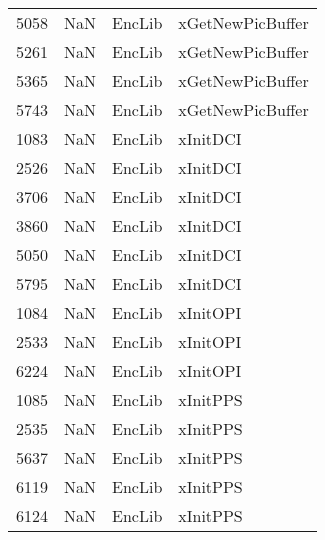 \begin{tabular}{llll}
5058 &                   NaN &                     EncLib &                          xGetNewPicBuffer \\
5261 &                   NaN &                     EncLib &                          xGetNewPicBuffer \\
5365 &                   NaN &                     EncLib &                          xGetNewPicBuffer \\
5743 &                   NaN &                     EncLib &                          xGetNewPicBuffer \\
1083 &                   NaN &                     EncLib &                                  xInitDCI \\
2526 &                   NaN &                     EncLib &                                  xInitDCI \\
3706 &                   NaN &                     EncLib &                                  xInitDCI \\
3860 &                   NaN &                     EncLib &                                  xInitDCI \\
5050 &                   NaN &                     EncLib &                                  xInitDCI \\
5795 &                   NaN &                     EncLib &                                  xInitDCI \\
1084 &                   NaN &                     EncLib &                                  xInitOPI \\
2533 &                   NaN &                     EncLib &                                  xInitOPI \\
6224 &                   NaN &                     EncLib &                                  xInitOPI \\
1085 &                   NaN &                     EncLib &                                  xInitPPS \\
2535 &                   NaN &                     EncLib &                                  xInitPPS \\
5637 &                   NaN &                     EncLib &                                  xInitPPS \\
6119 &                   NaN &                     EncLib &                                  xInitPPS \\
6124 &                   NaN &                     EncLib &                                  xInitPPS \\

\end{tabular}
